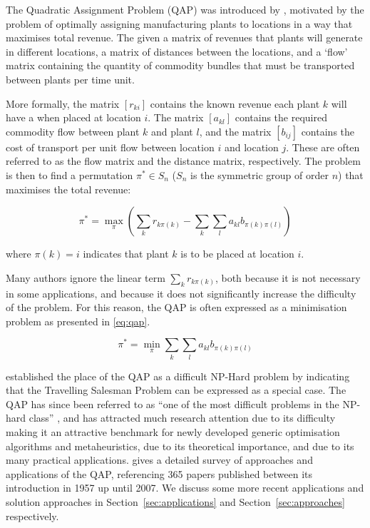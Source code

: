 
%

The Quadratic Assignment Problem (QAP) was introduced by \citet{Koopmans:1957gf}, motivated by the problem of optimally assigning manufacturing plants to locations in a way that maximises total revenue.
The given a matrix of revenues that plants will generate in different locations, a matrix of distances between the locations, and a `flow' matrix containing the quantity of commodity bundles that must be transported between plants per time unit.

More formally, the matrix \([r_{ki}]\) contains the known revenue each plant \(k\) will have a when placed at location \(i\).
The matrix \([a_{kl}]\) contains the required commodity flow between plant \(k\) and plant \(l\), and the matrix \([b_{ij}]\) contains the cost of transport per unit flow between location \(i\) and location \(j\). These are often referred to as the flow matrix and the distance matrix, respectively.
The problem is then to find a permutation \(\pi^{*} \in S_n\) (\(S_n\) is the symmetric group of order \(n\)) that maximises the total revenue:

\[ \pi^{*} = \max_{\pi} \left(\sum_{k}{r_{k\pi(k)}} - \sum_{k}\sum_{l}{a_{kl}b_{\pi(k)\pi(l)}}\right) \]

where  \(\pi(k) = i\) indicates that plant \(k\) is to be placed at location \(i\).

Many authors ignore the linear term \(\sum_{k}{r_{k\pi(k)}}\), both because it is not necessary in some applications, and because it does not significantly increase the difficulty of the problem. For this reason, the QAP is often expressed as a minimisation problem as presented in \eqref{eq:qap}.

\begin{equation}
    \label{eq:qap}
    \pi^{*} = \min_{\pi} \sum_{k}\sum_{l}{a_{kl}b_{\pi(k)\pi(l)}}
\end{equation}

\citeauthor{Koopmans:1957gf} established the place of the QAP as a difficult NP-Hard problem by indicating that the Travelling Salesman Problem can be expressed as a special case. The QAP has since been referred to as ``one of the most difficult problems in the NP-hard class'' \citep{Loiola:2007jk}, and has attracted much research attention due to its difficulty making it an attractive benchmark for newly developed generic optimisation algorithms and metaheuristics, due to its theoretical importance, and due to its many practical applications.
\citet{Loiola:2007jk} gives a detailed survey of approaches and applications of the QAP, referencing 365 papers published between its introduction in 1957 up until 2007. We discuss some more recent applications and solution approaches in Section~\ref{sec:applications} and Section~\ref{sec:approaches} respectively.

